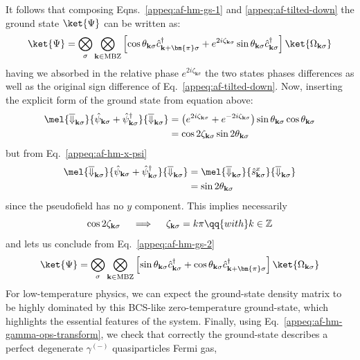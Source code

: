 It follows that composing Eqns.~\eqref{appeq:af-hm-gs-1} and \eqref{appeq:af-tilted-down} the ground state $\ket{\Psi}$ can be written as:
\begin{equation}\label{appeq:af-hm-gs-2}
	\ket{\Psi} = \bigotimes_\sigma \bigotimes_{\mathbf{k}\in\mathrm{MBZ}} \left[
		\cos \theta_{\mathbf{k}\sigma} \hat c_{\mathbf{k}+\bm{\pi}\sigma}^\dagger + e^{2i\zeta_{\mathbf{k}\sigma}} \sin\theta_{\mathbf{k}\sigma} \hat c_{\mathbf{k}\sigma}^\dagger
	\right] \ket{\Omega_{\mathbf{k}\sigma}}
\end{equation}
having we absorbed in the relative phase $e^{2i\zeta_{\mathbf{k}\sigma}}$ the two states phases differences as well as the original sign difference of Eq.~\eqref{appeq:af-tilted-down}. Now, inserting the explicit form of the ground state from equation above:
\[
\begin{aligned}
	\mel{\overline{\Downarrow}_{\mathbf{k}\sigma}}{\hat \psi_{\mathbf{k}\sigma} + \hat \psi_{\mathbf{k}\sigma}^\dagger}{\overline{\Downarrow}_{\mathbf{k}\sigma}} &= \left(e^{2i\zeta_{\mathbf{k}\sigma}} + e^{-2i\zeta_{\mathbf{k}\sigma}}\right) \sin\theta_{\mathbf{k}\sigma} \cos\theta_{\mathbf{k}\sigma} \\
	&= \cos 2\zeta_{\mathbf{k}\sigma} \sin 2\theta_{\mathbf{k}\sigma}
\end{aligned}
\]
but from Eq.~\eqref{appeq:af-hm-x-psi}
\[
\begin{aligned}
	\mel{\overline{\Downarrow}_{\mathbf{k}\sigma}}{\hat \psi_{\mathbf{k}\sigma} + \hat \psi_{\mathbf{k}\sigma}^\dagger}{\overline{\Downarrow}_{\mathbf{k}\sigma}} &= 	\mel{\overline{\Downarrow}_{\mathbf{k}\sigma}}{\hat s_{\mathbf{k}\sigma}^x}{\overline{\Downarrow}_{\mathbf{k}\sigma}} \\
	&= \sin 2\theta_{\mathbf{k}\sigma}
\end{aligned}
\]
since the pseudofield has no $y$ component. This implies necessarily
\[
	\cos 2\zeta_{\mathbf{k}\sigma}
	\quad\implies\quad
	\zeta_{\mathbf{k}\sigma} = k\pi
	\qq{with}
	k\in\mathbb{Z}
\]
and lets us conclude from Eq.~\eqref{appeq:af-hm-gs-2}
\begin{equation}\label{appeq:af-hm-gs-3}
	\ket{\Psi} = \bigotimes_\sigma \bigotimes_{\mathbf{k}\in\mathrm{MBZ}} \left[
	\sin \theta_{\mathbf{k}\sigma} \hat c_{\mathbf{k}\sigma}^\dagger + \cos \theta_{\mathbf{k}\sigma} \hat c_{\mathbf{k}+\bm{\pi}\sigma}^\dagger
	\right] \ket{\Omega_{\mathbf{k}\sigma}}
\end{equation}
For low-temperature physics, we can expect the ground-state density matrix to be highly dominated by this BCS-like zero-temperature ground-state, which highlights the essential features of the system. Finally, using Eq.~\eqref{appeq:af-hm-gamma-ops-transform}, we check that correctly the ground-state describes a perfect degenerate $\gamma^{(-)}$ quasiparticles Fermi gas,
